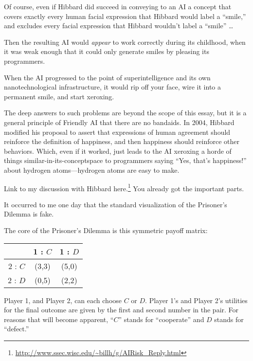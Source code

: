 {
 Of course, even if Hibbard did succeed in conveying to an AI a
concept that covers exactly every human facial expression that Hibbard
would label a ``smile,'' and
excludes every facial expression that Hibbard wouldn't
label a ``smile'' \ldots}

{
 Then the resulting AI would \textit{appear} to work correctly
during its childhood, when it was weak enough that it could only
generate smiles by pleasing its programmers.}

{
 When the AI progressed to the point of superintelligence and its
own nanotechnological infrastructure, it would rip off your face, wire
it into a permanent smile, and start xeroxing.}

{
 The deep answers to such problems are beyond the scope of this
essay, but it is a general principle of Friendly AI that there are no
bandaids. In 2004, Hibbard modified his proposal to assert that
expressions of human agreement should reinforce the definition of
happiness, and then happiness should reinforce other behaviors. Which,
even if it worked, just leads to the AI xeroxing a horde of things
similar-in-its-conceptspace to programmers saying
``Yes, that's
happiness!'' about hydrogen atoms---hydrogen atoms
are easy to make.}

{
 Link to my discussion with Hibbard here.\footnote{\url{http://www.ssec.wisc.edu/~billh/g/AIRisk_Reply.html}} You already got the
important parts.}

\myendsectiontext


\bigskip


{
 It occurred to me one day that the standard visualization of the
Prisoner's Dilemma is fake. }

{
 The core of the Prisoner's Dilemma is this
symmetric payoff matrix:}

\begin{center}
  \begin{tabular}{|c|c|c|}
    \hline
    &  1 : $C$ & 1 : $D$ \\
    \hline
    2 : $C$ & (3,3) & (5,0) \\
    \hline
    2 : $D$ & (0,5) & (2,2) \\
    \hline
  \end{tabular}
\end{center}

{
  Player 1, and
Player 2, can each choose $C$ or $D$. Player 1's and Player
2's utilities for the final outcome are given by the
first and second number in the pair. For reasons that will become
apparent, ``$C$'' stands for
``cooperate'' and $D$ stands for
``defect.''}

